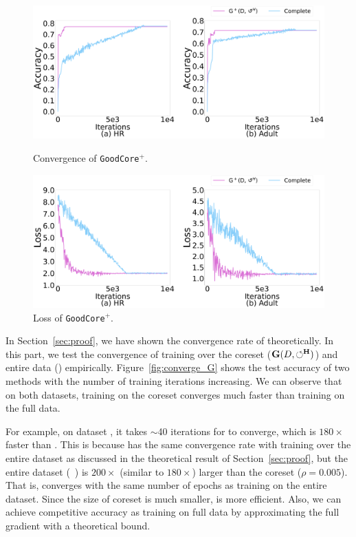 \begin{figure}[t]   
	\centering
	\begin{minipage}[t]{0.49\textwidth}
		\centering
		\includegraphics[width=\columnwidth]{figs/G+_a}
		\vspace{-1.5em}
		\caption{Convergence of \texttt{GoodCore}$^+$.}
		\label{fig:converge_G+}
	\end{minipage}
	\begin{minipage}[t]{0.49\textwidth}
		\centering
		\includegraphics[width=\columnwidth]{figs/G+}
		\vspace{-1.5em}
		\caption{Loss of \texttt{GoodCore}$^+$.}
		\label{fig:real_loss_G+}
	\end{minipage}
	\vspace*{-1em}   
\end{figure}

In Section~\ref{sec:proof}, we have shown  the convergence rate of \ours theoretically. In this part, we test the convergence of training over the coreset ($\mathbf{G}(D,\circlearrowleft^\mathbf{H})$) and entire data (\truth) empirically.  Figure~\ref{fig:converge_G} shows the test accuracy of two methods with the number of training iterations increasing. We can observe that on both datasets, training on the coreset converges much faster than training on the full data. 

For example, on dataset \adult, it takes $\sim$40 iterations for \ours to converge, which is  $180\times$ faster than {\truth}. This is because \ours has the same convergence rate with training over the entire dataset as discussed in the theoretical result of Section~\ref{sec:proof}, but the entire dataset (\eg  ~\adult) is $200\times$ (similar to $180\times$) larger than the coreset ($\rho=0.005$).
 That is, \ours converges with the same number of epochs  as training on the entire dataset. Since the size of coreset is much smaller, \ours is more efficient. Also, we can achieve competitive accuracy as training on full data by approximating the full gradient with a theoretical bound. 

